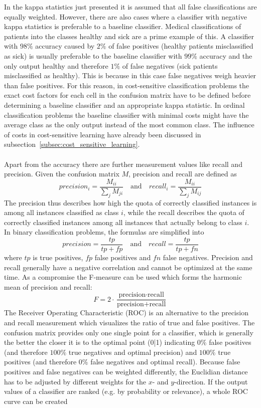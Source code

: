 \documentclass[article,type=msc,colorback,accentcolor=tud7b]{tudthesis}
\begin{document}
    In the kappa statistics just presented it is assumed that all false classifications are equally weighted. However, there are also cases where a classifier with negative kappa statistics is preferable to a baseline classifier. Medical classifications of patients into the classes healthy and sick are a prime example of this. A classifier with $98\%$ accuracy caused by $2\%$ of false positives (healthy patients misclassified as sick) is usually preferable to the baseline classifier with $99\%$ accuracy and the only output healthy and therefore $1\%$ of false negatives (sick patients misclassified as healthy). This is because in this case false negatives weigh heavier than false positives. For this reason, in cost-sensitive classification problems the exact cost factors for each cell in the confusion matrix have to be defined before determining a baseline classifier and an appropriate kappa statistic. In ordinal classification problems the baseline classifier with minimal costs might have the average class as the only output instead of the most common class. The influence of costs in cost-sensitive learning have already been discussed in subsection~\ref{subsec:cost_sensitive_learning}. \\\\
    Apart from the accuracy there are further measurement values like recall and precision. Given the confusion matrix $M$, precision and recall are defined as
    \[precision_{i}=\frac{M_{i i}}{\sum_{j}M_{ji}} \quad \textrm{and} \quad recall_{i}=\frac{M_{i i}}{\sum_{j}M_{ij}}\]
    The precision thus describes how high the quota of correctly classified instances is among all instances classified as class $i$, while the recall describes the quota of correctly classified instances among all instances that actually belong to class $i$. In binary classification problems, the formulas are simplified into
    \[precision=\frac{tp}{tp+fp} \quad \textrm{and} \quad recall=\frac{tp}{tp+fn}\]
    where $tp$ is true positives, $fp$ false positives and $fn$ false negatives. Precision and recall generally have a negative correlation and cannot be optimized at the same time. As a compromise the F-measure can be used which forms the harmonic mean of precision and recall:
    \[F=2\cdot\frac{\text{precision}\cdot\text{recall}}{\text{precision}+\text{recall}}\]
    The Receiver Operating Characteristic (ROC) is an alternative to the precision and recall measurement which visualizes the ratio of true and false positives. The confusion matrix provides only one single point for a classifier, which is generally the better the closer it is to the optimal point (0|1) indicating $0\%$ false positives (and therefore $100\%$ true negatives and optimal precision) and $100\%$ true positives (and therefore $0\%$ false negatives and optimal recall). Because false positives and false negatives can be weighted differently, the Euclidian distance has to be adjusted by different weights for the $x$- and $y$-direction. If the output values of a classifier are ranked (e.g. by probability or relevance), a whole ROC curve can be created
\end{document}

